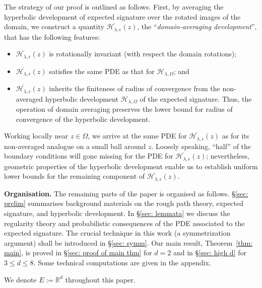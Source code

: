 \documentclass[11pt,a4paper,english,reqno]{amsart}
\theoremstyle{plain}
\newcommand{\R}{\mathbb{R}}
\newcommand{\e}{\epsilon}
\newcommand{\1}{\mathbbm{1}}
\begin{document}
The strategy of our proof is outlined as follows. First, by averaging the hyperbolic development of expected signature over the rotated images of the domain, we construct a quantity $\overline{\mathcal{H}_{\lambda, \e}}(z)$, the ``\emph{domain-averaging development}'', that has the following features:
\begin{itemize}
    \item 
$\overline{\mathcal{H}_{\lambda, \e}}(z)$ is rotationally  invariant (with respect the domain rotations);
\item
$\overline{\mathcal{H}_{\lambda, \e}}(z)$ satisfies the same PDE as that for $\mathcal{H}_{\lambda, \Omega}$; and
\item
$\overline{\mathcal{H}_{\lambda, \e}}(z)$ inherits the finiteness of radius of convergence from the non-averaged hyperbolic development $\mathcal{H}_{\lambda, \Omega}$ of the expected signature. Thus, the operation of domain averaging preserves the lower bound for radius of convergence of the hyperbolic development. 
\end{itemize}
Working locally near $z \in \Omega$, we arrive at the same PDE for $\overline{\mathcal{H}_{\lambda, \e}}(z)$ as for its  non-averaged analogue on a small ball around $z$. Loosely speaking, ``half'' of the boundary conditions will gone missing for the PDE for $\overline{\mathcal{H}_{\lambda, \e}}(z)$; nevertheless, geometric properties of the hyperbolic development enable us to establish uniform lower bounds for the remaining component of $\overline{\mathcal{H}_{\lambda, \e}}(z)$. 




\noindent
{\bf Organisation.} The remaining parts of the paper is organised as follows. \S\ref{sec: prelim} summarises background materials on the rough path theory, expected signature, and hyperbolic development. In \S\ref{sec: lemmata} we discuss the regularity theory and  probabilistic consequences of the PDE associated to the expected signature. The crucial technique in this work (a symmetrization argument) shall be introduced in \S\ref{sec: symm}. Our main result, Theorem~\ref{thm: main}, is proved in \S\ref{sec: proof of main thm} for $d=2$ and in \S\ref{sec: high d} for $3\leq d \leq 8$. Some technical computations are given in the appendix.



We denote $E := \R^d$ throughout this paper.
\end{document}
